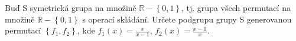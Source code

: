 Buď S symetrická grupa na množině $\mathbb{R}-\left \{ 0,1 \right \}$, tj. grupa
všech permutací na množině $\mathbb{R}-\left \{ 0,1 \right \}$ s operací
skládání. Určete podgrupu grupy S generovanou permutací $\left \{ f_{1},f_{2}
\right \}$, kde $f_{1}(x)=\frac{x}{x-1}$, $f_{2}(x)=\frac{x-1}{x}$.
